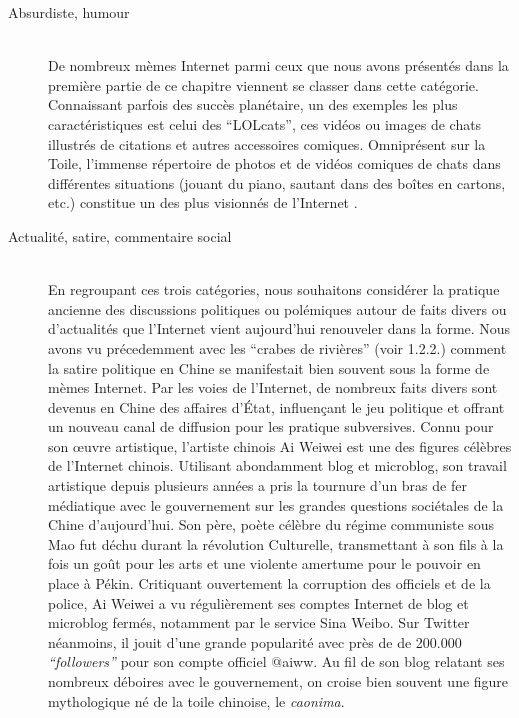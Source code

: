 \begin{description}

\item[Absurdiste, humour]
\hfill \\
De nombreux m\`emes Internet parmi ceux que nous avons pr\'esent\'es dans la premi\`ere partie de ce chapitre viennent se classer dans cette cat\'egorie. Connaissant parfois des succ\`es plan\'etaire, un des exemples les plus caract\'eristiques est celui des {\textquotedblleft}LOLcats{\textquotedblright}, ces vid\'eos ou images de chats illustr\'es de citations et autres accessoires comiques. Omnipr\'esent sur la Toile, l{\textquoteright}immense r\'epertoire de photos et de vid\'eos comiques de chats dans diff\'erentes situations (jouant du piano, sautant dans des bo\^ites en cartons, etc.) constitue un des plus visionn\'es de l{\textquoteright}Internet \citep{Bauckage2011}. 

\item[Actualit\'e, satire, commentaire social]
\hfill \\
En regroupant ces trois cat\'egories, nous souhaitons consid\'erer la pratique ancienne des discussions politiques ou pol\'emiques autour de faits divers ou d{\textquoteright}actualit\'es que l{\textquoteright}Internet vient aujourd{\textquoteright}hui renouveler dans la forme. Nous avons vu pr\'ecedemment avec les {\textquotedblleft}crabes de rivi\`eres{\textquotedblright} (voir 1.2.2.) \textcolor[rgb]{0.0,0.0,0.039215688}{comment la satire politique en Chine se manifestait bien souvent sous la forme de m\`emes Internet. Par les voies de l{\textquoteright}Internet, }de nombreux faits divers sont devenus en Chine des affaires d{\textquoteright}\'Etat, influen\c{c}ant le jeu politique et offrant un nouveau canal de diffusion pour les pratique subversives. Connu pour son {\oe}uvre artistique, l{\textquoteright}artiste chinois Ai Weiwei est une des figures c\'el\`ebres de l{\textquoteright}Internet chinois. Utilisant abondamment blog et microblog, son travail artistique depuis plusieurs ann\'ees a pris la tournure d{\textquoteright}un bras de fer m\'ediatique avec le gouvernement sur les grandes questions soci\'etales de la Chine d{\textquoteright}aujourd{\textquoteright}hui. Son p\`ere, po\`ete c\'el\`ebre du r\'egime communiste sous Mao fut d\'echu durant la r\'evolution Culturelle, transmettant \`a son fils \`a la fois un go\^ut pour les arts et une violente amertume pour le pouvoir en place \`a P\'ekin. Critiquant ouvertement la corruption des officiels et de la police, Ai Weiwei a vu r\'eguli\`erement ses comptes Internet de blog et microblog ferm\'es, notamment par le service Sina Weibo. Sur Twitter n\'eanmoins, il jouit d{\textquoteright}une grande popularit\'e avec pr\`es de de 200.000 \textit{{\textquotedblleft}followers{\textquotedblright}} pour son compte officiel @aiww. Au fil de son blog relatant ses nombreux d\'eboires avec le gouvernement, on croise bien souvent une figure mythologique n\'e de la toile chinoise, le \textit{caonima}.  


\end{description}

